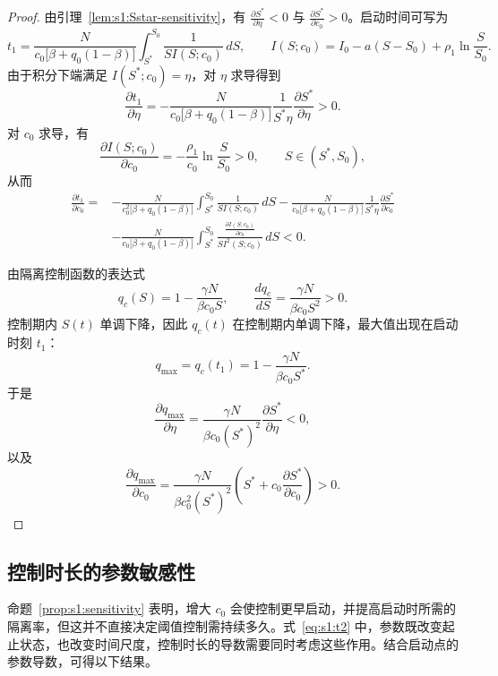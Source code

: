 \documentclass[lang=cn,a4paper,newtx]{elegantpaper}
\numberwithin{equation}{section}
\theoremstyle{plain}
\begin{document}
\begin{proof}
由引理~\ref{lem:s1:Sstar-sensitivity}，有
$\frac{\partial S^*}{\partial \eta}<0$ 与 $\frac{\partial S^*}{\partial c_0}>0$。启动时间可写为
\begin{equation}
t_1
=
\frac{N}{c_0\bigl[\beta+q_0(1-\beta)\bigr]}
\int_{S^*}^{S_0}
\frac{1}{S I(S;c_0)}\,dS,
\qquad
I(S;c_0)
=
I_0-a(S-S_0)+\rho_1\ln\frac{S}{S_0}.
\end{equation}
由于积分下端满足 $I(S^*;c_0)=\eta$，对 $\eta$ 求导得到
\begin{equation}
\frac{\partial t_1}{\partial \eta}
=
-\frac{N}{c_0\bigl[\beta+q_0(1-\beta)\bigr]}
\frac{1}{S^*\eta}
\frac{\partial S^*}{\partial \eta}>0.
\end{equation}
对 $c_0$ 求导，有
\[
\frac{\partial I(S;c_0)}{\partial c_0}
=
-\frac{\rho_1}{c_0}\ln\frac{S}{S_0}>0,
\qquad S\in(S^*,S_0),
\]
从而
\begin{align}
\frac{\partial t_1}{\partial c_0}
=&
-\frac{N}{c_0^2\bigl[\beta+q_0(1-\beta)\bigr]}
\int_{S^*}^{S_0}\frac{1}{S I(S;c_0)}\,dS
-\frac{N}{c_0\bigl[\beta+q_0(1-\beta)\bigr]}
\frac{1}{S^*\eta}
\frac{\partial S^*}{\partial c_0} \nonumber\\
&-\frac{N}{c_0\bigl[\beta+q_0(1-\beta)\bigr]}
\int_{S^*}^{S_0}
\frac{\frac{\partial I(S;c_0)}{\partial c_0}}{S I^2(S;c_0)}\,dS
<0.
\end{align}


由隔离控制函数的表达式
\[
q_c(S)=1-\frac{\gamma N}{\beta c_0S},
\qquad
\frac{dq_c}{dS}
=
\frac{\gamma N}{\beta c_0S^2}>0.
\]
控制期内 $S(t)$ 单调下降，因此 $q_c(t)$ 在控制期内单调下降，最大值出现在启动时刻 $t_1$：
\[
q_{\max}
=
q_c(t_1)
=
1-\frac{\gamma N}{\beta c_0S^*}.
\]
于是
\[
\frac{\partial q_{\max}}{\partial \eta}
=
\frac{\gamma N}{\beta c_0(S^*)^2}\frac{\partial S^*}{\partial \eta}<0,
\]
以及
\[
\frac{\partial q_{\max}}{\partial c_0}
=
\frac{\gamma N}{\beta c_0^2(S^*)^2}
\left(S^*+c_0\frac{\partial S^*}{\partial c_0}\right)>0.
\]
\end{proof}

\subsection{控制时长的参数敏感性}
命题~\ref{prop:s1:sensitivity} 表明，增大 $c_0$ 会使控制更早启动，并提高启动时所需的隔离率，但这并不直接决定阈值控制需持续多久。式~\eqref{eq:s1:t2} 中，参数既改变起止状态，也改变时间尺度，控制时长的导数需要同时考虑这些作用。结合启动点的参数导数，可得以下结果。
\end{document}

